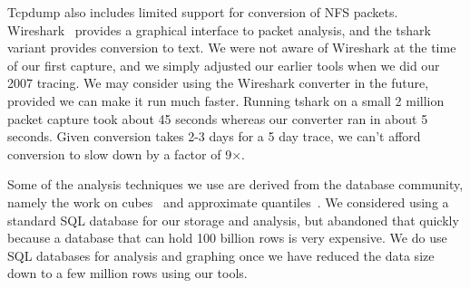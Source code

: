 
Tcpdump also includes limited support for conversion of NFS packets.
Wireshark~\cite{wireshark} provides a graphical interface to packet
analysis, and the tshark variant provides conversion to text.  We were
not aware of Wireshark at the time of our first capture, and we simply
adjusted our earlier tools when we did our 2007 tracing.  We may
consider using the Wireshark converter in the future, provided we can
make it run much faster.  Running tshark on a small 2 million packet
capture took about 45 seconds whereas our converter ran in about 5
seconds.  Given conversion takes 2-3 days for a 5 day trace, we can't
afford conversion to slow down by a factor of 9$\times$.

Some of the analysis techniques we use are derived from the database
community, namely the work on cubes~\cite{gray97cube} and approximate
quantiles~\cite{Manku98approximatemedians}.  We considered using a
standard SQL database for our storage and analysis, but abandoned that
quickly because a database that can hold 100 billion rows is
very expensive.  We do use SQL databases for analysis and graphing
once we have reduced the data size down to a few million rows using
our tools.




